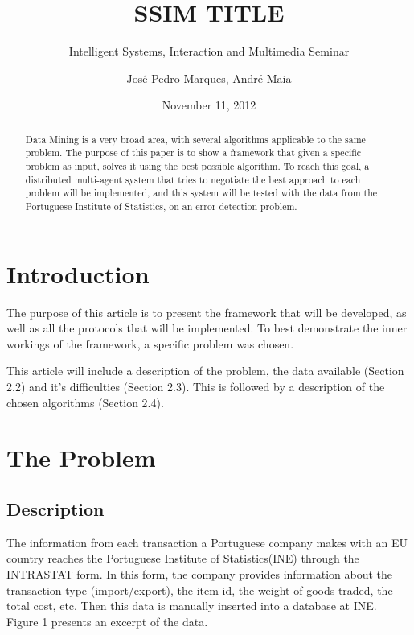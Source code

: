 \documentclass{llncs}
\begin{document}
\title{SSIM TITLE}
\subtitle{Intelligent Systems, Interaction and Multimedia Seminar}
\author{José Pedro Marques, André Maia}
\date{November 11, 2012}
\maketitle


\begin{abstract}
Data Mining is a very broad area, with several algorithms applicable to the same problem. The purpose of this paper is to show a framework that given a specific problem as input, solves it using the best possible algorithm. To reach this goal, a distributed multi-agent system that tries to negotiate the best approach to each problem will be implemented, and this system will be tested with the data from the Portuguese Institute of Statistics, on an error detection problem.
\end{abstract}



\section{Introduction}

The purpose of this article is to present the framework that will be developed, as well as all the protocols that will be implemented. To best demonstrate the inner workings of the framework, a specific problem was chosen.

This article will include a description of the problem, the data available (Section 2.2) and it's difficulties (Section 2.3). This is followed by a description of the chosen algorithms (Section 2.4).

\section{The Problem}

\subsection{Description}

The information from each transaction a Portuguese company makes with an EU country reaches the Portuguese Institute of Statistics(INE) through the INTRASTAT form. In this form, the company provides information  about the transaction type (import/export), the item id, the weight of goods traded, the total cost, etc. Then this data is manually inserted into a database at INE. Figure 1 presents an excerpt of the data.
\end{document}

